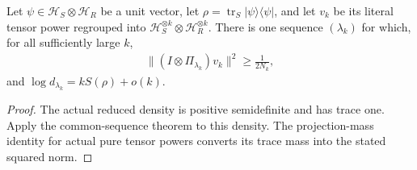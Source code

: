 \begin{theorem}
\label{thm:high_label_pure_sequence}
\leanok
{}
Let $\psi\in\mathcal H_S\otimes\mathcal H_R$ be a unit vector, let
$\rho=\operatorname{tr}_S|\psi\rangle\langle\psi|$, and let $v_k$ be its
literal tensor power regrouped into $\mathcal H_S^{\otimes k}\otimes
\mathcal H_R^{\otimes k}$. There is one sequence $(\lambda_k)$ for which,
for all sufficiently large $k$,
\begin{align}
 \|(I\otimes\Pi_{\lambda_k})v_k\|^2\ge\frac1{2N_k},
\end{align}
and $\log d_{\lambda_k}=kS(\rho)+o(k)$.
\end{theorem}
\begin{proof}
\leanok
{}
The actual reduced density is positive semidefinite and has trace one.
Apply the common-sequence theorem to this density. The projection-mass
identity for actual pure tensor powers converts its trace mass into the
stated squared norm.
\end{proof}
